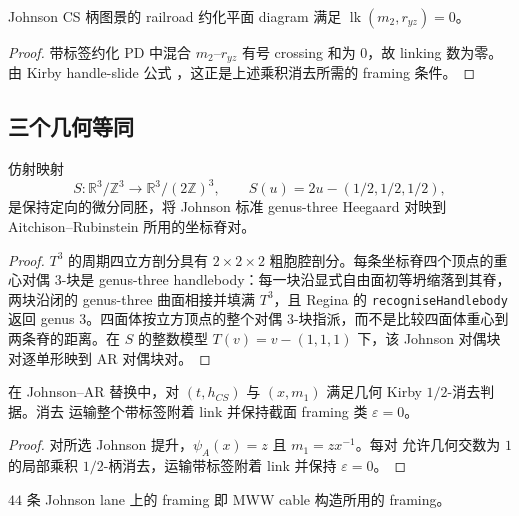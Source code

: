 \begin{lemma}\label{lem:P0d-link}
Johnson CS 柄图景的 railroad 约化平面 diagram 满足
$\operatorname{lk}(m_2,r_{yz})=0$。
\end{lemma}

\begin{proof}
带标签约化 PD 中混合 $m_2$--$r_{yz}$ 有号 crossing 和为
$0$，故 linking 数为零。由 Kirby handle-slide 公式
\cite{Kirby1978}，这正是上述乘积消去所需的 framing 条件。
\end{proof}

\subsection{三个几何等同}

\begin{lemma}\label{lem:P0a}
仿射映射
\[
S:\mathbb R^3/\mathbb Z^3\longrightarrow
\mathbb R^3/(2\mathbb Z)^3,\qquad
S(u)=2u-(1/2,1/2,1/2),
\]
是保持定向的微分同胚，将 Johnson 标准
genus-three Heegaard 对映到 Aitchison--Rubinstein 所用的坐标脊对。
\end{lemma}

\begin{proof}
$T^3$ 的周期四立方剖分具有 $2\times 2\times 2$ 粗胞腔剖分。每条坐标脊四个顶点的重心对偶 $3$-块是 genus-three handlebody：每一块沿显式自由面初等坍缩落到其脊，两块沿闭的 genus-three 曲面相接并填满 $T^3$，且 Regina 的 \texttt{recogniseHandlebody} 返回 genus $3$。四面体按立方顶点的整个对偶 $3$-块指派，而不是比较四面体重心到两条脊的距离。在 $S$ 的整数模型 $T(v)=v-(1,1,1)$ 下，该 Johnson 对偶块对逐单形映到 AR 对偶块对。
\end{proof}

\begin{lemma}\label{lem:P0b}
在 Johnson--AR 替换中，对 \((t,h_{CS})\) 与 \((x,m_1)\)
满足几何 Kirby \(1/2\)-消去判据。消去
运输整个带标签附着 link 并保持截面 framing 类 \(\varepsilon=0\)。
\end{lemma}

\begin{proof}
对所选 Johnson 提升，$\psi_A(x)=z$ 且 $m_1=zx^{-1}$。每对
允许几何交数为 $1$ 的局部乘积 $1/2$-柄消去，运输带标签附着 link 并保持
$\varepsilon=0$。
\end{proof}

\begin{lemma}\label{lem:P0c}
$44$ 条 Johnson lane 上的 framing 即 MWW cable
构造所用的 framing。
\end{lemma}


